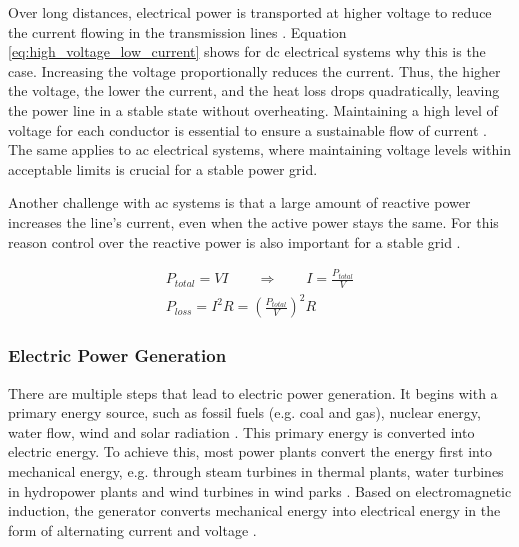 Over long distances, electrical power is transported at higher voltage to reduce the current flowing in the transmission lines \cite{rl4network_operation}. Equation \eqref{eq:high_voltage_low_current} shows for \ac{dc} electrical systems why this is the case. Increasing the voltage proportionally reduces the current. Thus, the higher the voltage, the lower the current, and the heat loss drops quadratically, leaving the power line in a stable state without overheating. Maintaining a high level of voltage for each conductor is essential to ensure a sustainable flow of current \cite{rl4network_operation}. The same applies to \ac{ac} electrical systems, where maintaining voltage levels within acceptable limits is crucial for a stable power grid. 

Another challenge with \ac{ac} systems is that a large amount of reactive power increases the line's current, even when the active power stays the same. For this reason control over the reactive power is also important for a stable grid \cite{power_sys_analysis}.

\begin{equation}\label{eq:high_voltage_low_current}
    \begin{aligned}
    P_{total} = VI \qquad\Rightarrow\qquad I = \frac{P_{total}}{V}\\
    P_{loss} = I^2R = (\frac{P_{total}}{V})^{2}R
    \end{aligned}
\end{equation}

\subsubsection{Electric Power Generation}
There are multiple steps that lead to electric power generation. It begins with a primary energy source, such as fossil fuels (e.g. coal and gas), nuclear energy, water flow, wind and solar radiation \cite{power_sys_analysis}. This primary energy is converted into electric energy. To achieve this, most power plants convert the energy first into mechanical energy, e.g. through steam turbines in thermal plants, water turbines in hydropower plants and wind turbines in wind parks \cite{electircal_machines}. Based on electromagnetic induction, the generator converts mechanical energy into electrical energy in the form of alternating current and voltage \cite{electircal_machines}.


